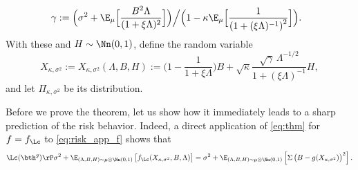 $$
\hspace{-0.1in}\gamma := 
\Big({\sigma^2 + \E_{\mu}\Big[\frac{B^2\Lambda}{(1+\xi\Lambda)^2}\Big]}\Big)\Big/\Big({1-\kappa\E_{\mu}\Big[\frac{1}{\left(1+(\xi\Lambda)^{-1}\right)^2}\Big]}\Big).
$$
With these and $H\sim\Nn(0,1)$, define the random variable
$$
X_{\kappa,\sigma^2}:=X_{\kappa,\sigma^2}(\Lambda,B,H) := \Big(1-\frac{1}{1+ \xi\Lambda}\Big) B + \sqrt{\kappa}\frac{\sqrt{\gamma}\,\Lambda^{-1/2}}{1+(\xi\Lambda)^{-1}} H, 
$$
and let $\Pi_{\kappa,\sigma^2}$ be its distribution.


%

\mainthm*

Before we prove the theorem, let us show how it immediately leads to a sharp prediction of the risk behavior. Indeed, a direct application of \eqref{eq:thm} for $f=f_\Lc$ to \eqref{eq:risk_app_f} shows that
\begin{align}
\Lc(\bth^g)\rP \sigma^2 +  \E_{(\Lambda,B,H)\sim\mu\otimes\Nn(0,1)}\left[f_\Lc(X_{\kappa,\sigma^2},B,\Lambda) \right] = \sigma^2 +  \E_{(\Lambda,B,H)\sim\mu\otimes\Nn(0,1)}\left[\Sigma\left(B-g(X_{\kappa,\sigma^2})\right)^2 \right].\label{eq:risk_app_f2}
\end{align}


